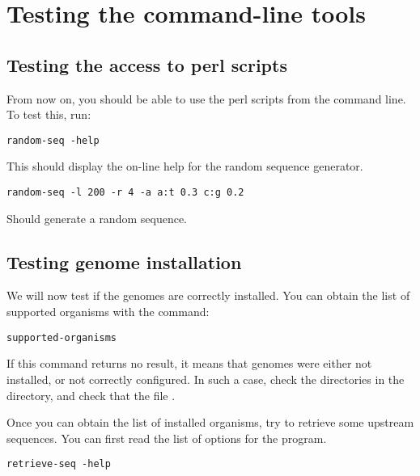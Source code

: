 \documentclass{book}
\begin{document}




\chapter{Testing the command-line tools}

\section{Testing the access to perl scripts}

From now on, you should be able to use the perl scripts from the
command line. To test this, run:

\begin{verbatim}
random-seq -help
\end{verbatim}

This should display the on-line help for the random sequence
generator.

\begin{verbatim}
random-seq -l 200 -r 4 -a a:t 0.3 c:g 0.2
\end{verbatim}

Should generate a random sequence.

\section{Testing genome installation}

We will now test if the genomes are correctly installed. You can
obtain the list of supported organisms with the command:

\begin{verbatim}
supported-organisms
\end{verbatim}

If this command returns no result, it means that genomes were either
not installed, or not correctly configured. In such a case, check the
directories in the  directory, and check that the
file .

Once you can obtain the list of installed organisms, try to retrieve
some upstream sequences. You can first read the list of options for the
 program.

\begin{verbatim}
retrieve-seq -help
\end{verbatim}
\end{document}
